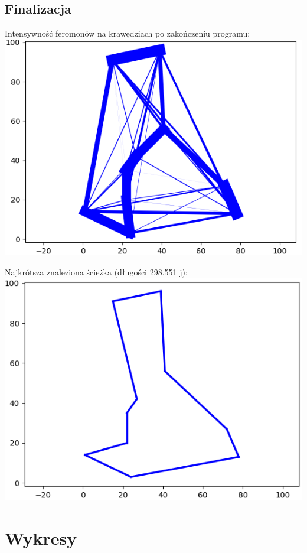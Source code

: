 \documentclass[11pt]{article}
\begin{document}
\subsection{Finalizacja}\label{sub:finalizacja} %
Intensywność feromonów na krawędziach po zakończeniu programu:\\
\includegraphics[scale=0.5]{images/fer_res.png}

Najkrótsza znaleziona ścieżka (długości 298.551 j):\\
\includegraphics[scale=0.5]{images/path.png}


\section{Wykresy}\label{sec:wykresy} %
\end{document}
